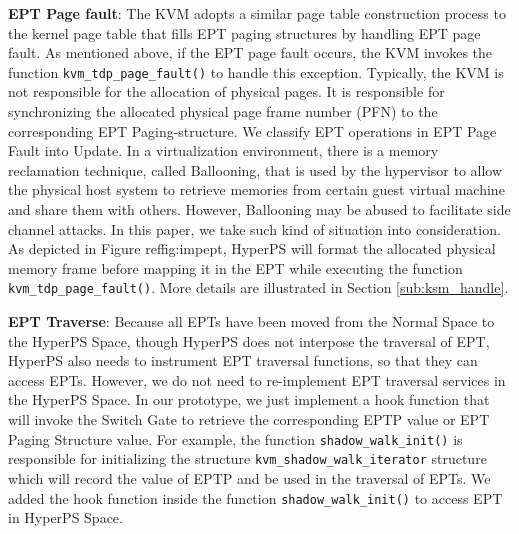 \textbf{EPT Page fault}:
The KVM adopts a similar page table construction process to the kernel page table that fills EPT paging structures by handling EPT page fault. 
As mentioned above, if the EPT page fault occurs, the KVM invokes the function \verb|kvm_tdp_page_fault()| to handle this exception. 
Typically, the KVM is not responsible for the allocation of physical pages. 
It is responsible for synchronizing the allocated physical page frame number (PFN) to the corresponding EPT Paging-structure. We classify EPT operations in EPT Page Fault into Update. 
In a virtualization environment, there is a memory reclamation technique, called Ballooning, that is used by the hypervisor to allow the physical host system to retrieve memories from certain guest virtual machine and share them with others. 
However, Ballooning may be abused to facilitate side channel attacks. 
In this paper, we take such kind of situation into consideration. As depicted in Figure ref{fig:impept}, 
HyperPS will format the allocated physical memory frame before mapping it in the EPT while executing the function \verb|kvm_tdp_page_fault()|. More details are illustrated in Section \ref{sub:ksm_handle}. 

\textbf{EPT Traverse}: 
Because all EPTs have been moved from the Normal Space to the HyperPS Space, though HyperPS does not interpose the traversal of EPT, HyperPS also needs to instrument EPT traversal functions, so that they can access EPTs. 
However, we do not need to re-implement EPT traversal services in the HyperPS Space. In our prototype, we just implement a hook function that will invoke the Switch Gate to retrieve the corresponding EPTP value or EPT Paging Structure value. 
For example, the function \verb|shadow_walk_init()| is responsible for initializing the structure \verb|kvm_shadow_walk_iterator| structure which will record the value of EPTP and be used in the traversal of EPTs. We added the hook function inside the function \verb|shadow_walk_init()| to access EPT in HyperPS Space. 

